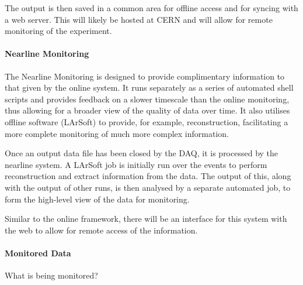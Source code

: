 The output is then saved in a common area for offline access and for syncing
with a web server. This will likely be hosted at CERN and will allow for remote
monitoring of the experiment.

\paragraph{Nearline Monitoring}
The Nearline Monitoring is designed to provide complimentary information to
that given by the online system. It runs separately as a series of automated
shell scripts and provides feedback on a slower timescale than the online
monitoring, thus allowing for a broader view of the quality of data over time.
It also utilises offline software (LArSoft) to provide, for example,
reconstruction, facilitating a more complete monitoring of much more complex
information.

Once an output data file has been closed by the DAQ, it is processed by the
nearline system.  A LArSoft job is initially run over the events to perform
reconstruction and extract information from the data.  The output of this,
along with the output of other runs, is then analysed by a separate automated
job, to form the high-level view of the data for monitoring.

Similar to the online framework, there will be an interface for this system
with the web to allow for remote access of the information.

\paragraph{Monitored Data}

What is being monitored?

